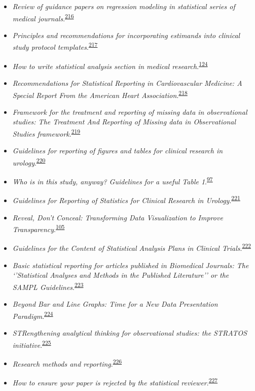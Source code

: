 \documentclass[
  a4paper,
]{book}
\begin{document}
\begin{itemize}
\item
  \emph{Review of guidance papers on regression modeling in statistical series of medical journals}.\textsuperscript{\protect\hyperlink{ref-Wallisch2022}{216}}
\item
  \emph{Principles and recommendations for incorporating estimands into clinical study protocol templates}.\textsuperscript{\protect\hyperlink{ref-Lynggaard2022}{217}}
\item
  \emph{How to write statistical analysis section in medical research}.\textsuperscript{\protect\hyperlink{ref-Dwivedi2022}{124}}
\item
  \emph{Recommendations for Statistical Reporting in Cardiovascular Medicine: A Special Report From the American Heart Association}.\textsuperscript{\protect\hyperlink{ref-Althouse2021}{218}}
\item
  \emph{Framework for the treatment and reporting of missing data in observational studies: The Treatment And Reporting of Missing data in Observational Studies framework}.\textsuperscript{\protect\hyperlink{ref-Lee2021}{219}}
\item
  \emph{Guidelines for reporting of figures and tables for clinical research in urology}.\textsuperscript{\protect\hyperlink{ref-Vickers2020}{220}}
\item
  \emph{Who is in this study, anyway? Guidelines for a useful Table 1}.\textsuperscript{\protect\hyperlink{ref-Hayes-Larson2019}{97}}
\item
  \emph{Guidelines for Reporting of Statistics for Clinical Research in Urology}.\textsuperscript{\protect\hyperlink{ref-assel2019}{221}}
\item
  \emph{Reveal, Don't Conceal: Transforming Data Visualization to Improve Transparency}.\textsuperscript{\protect\hyperlink{ref-Weissgerber2019}{105}}
\item
  \emph{Guidelines for the Content of Statistical Analysis Plans in Clinical Trials}.\textsuperscript{\protect\hyperlink{ref-Gamble2017}{222}}
\item
  \emph{Basic statistical reporting for articles published in Biomedical Journals: The `'Statistical Analyses and Methods in the Published Literature'' or the SAMPL Guidelines}.\textsuperscript{\protect\hyperlink{ref-Lang2015}{223}}
\item
  \emph{Beyond Bar and Line Graphs: Time for a New Data Presentation Paradigm}.\textsuperscript{\protect\hyperlink{ref-Weissgerber2015}{224}}
\item
  \emph{STRengthening analytical thinking for observational studies: the STRATOS initiative}.\textsuperscript{\protect\hyperlink{ref-Sauerbrei2014}{225}}
\item
  \emph{Research methods and reporting}.\textsuperscript{\protect\hyperlink{ref-groves2008}{226}}
\item
  \emph{How to ensure your paper is rejected by the statistical reviewer}.\textsuperscript{\protect\hyperlink{ref-stratton2005}{227}}
\end{itemize}
\end{document}

